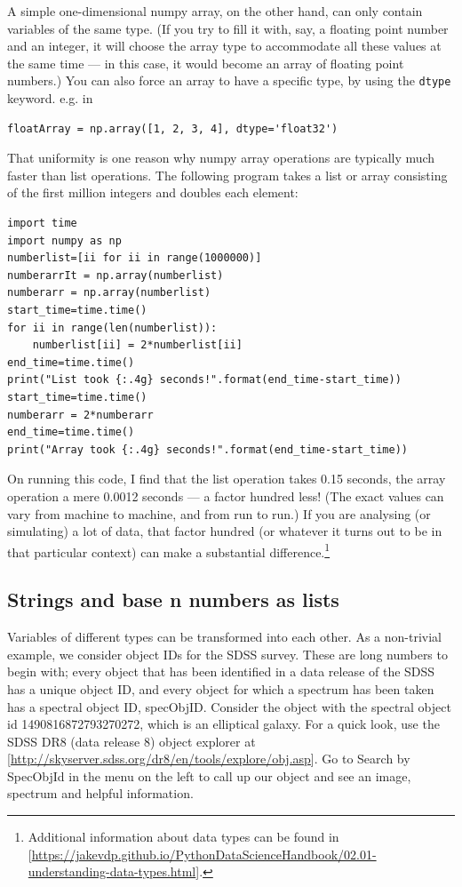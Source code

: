 \documentclass[twocolumn,apj]{openjournal}
\begin{document}
A simple one-dimensional numpy array, on the other hand, can only contain variables of the same type. (If you try to fill it with, say, a floating point number and an integer, it will choose the array type to accommodate all these values at the same time --- in this case, it would become an array of floating point numbers.) You can also force an array to have a specific type, by using the \verb|dtype| keyword. e.g. in 
\begin{lstlisting}
floatArray = np.array([1, 2, 3, 4], dtype='float32')
\end{lstlisting}

That uniformity is one reason why numpy array operations are typically much faster than list operations. The following program takes a list or array consisting of the first million integers and doubles each element:
\begin{lstlisting}
import time
import numpy as np
numberlist=[ii for ii in range(1000000)]
numberarrIt = np.array(numberlist)
numberarr = np.array(numberlist)
start_time=time.time()
for ii in range(len(numberlist)):
	numberlist[ii] = 2*numberlist[ii]
end_time=time.time()
print("List took {:.4g} seconds!".format(end_time-start_time))
start_time=time.time()
numberarr = 2*numberarr
end_time=time.time()
print("Array took {:.4g} seconds!".format(end_time-start_time))
\end{lstlisting}
On running this code, I find that the list operation takes 0.15 seconds, the array operation a mere 0.0012 seconds --- a factor hundred less! (The exact values can vary from machine to machine, and from run to run.) If you are analysing (or simulating) a lot of data, that factor hundred (or whatever it turns out to be in that particular context) can make a substantial difference.\footnote{Additional information about data types can be found in [\href{https://jakevdp.github.io/PythonDataScienceHandbook/02.01-understanding-data-types.html}{https://jakevdp.github.io/PythonDataScienceHandbook/02.01-understanding-data-types.html}].}

\subsection{Strings and base n numbers as lists}

Variables of different types can be transformed into each other. As a non-trivial example, we consider object IDs for the SDSS survey. These are long numbers to begin with; every object that has been identified in a data release of the SDSS has a unique object ID, and every object for which a spectrum has been taken has a spectral object ID, specObjID. Consider the object with the spectral object id 1490816872793270272, which is an elliptical galaxy. For a quick look, use the SDSS DR8 (data release 8) object explorer at
[\href{http://skyserver.sdss.org/dr8/en/tools/explore/obj.asp}{http://skyserver.sdss.org/dr8/en/tools/explore/obj.asp}]. Go to Search by SpecObjId in the menu on the left to call up our object and see an image, spectrum and helpful information.
\end{document}
